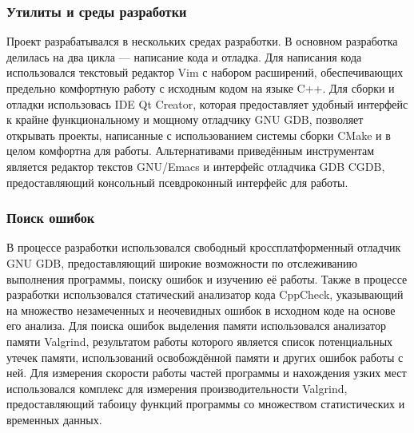 \documentclass[a4paper,12pt]{report}
\numberwithin{equation}{section}
\begin{document}
\subsubsection{Утилиты и среды разработки}
Проект разрабатывался в нескольких средах разработки. В основном разработка делилась на два цикла --- написание кода и отладка. Для написания кода использовался текстовый редактор Vim с набором расширений, обеспечивающих предельно комфортную работу с исходным кодом на языке C++. Для сборки и отладки использовась IDE Qt Creator, которая предоставляет удобный интерфейс к крайне функциональному и мощному отладчику GNU GDB, позволяет открывать проекты, написанные с использованием системы сборки CMake и в целом комфортна для работы. Альтернативами приведённым инструментам является редактор текстов GNU/Emacs и интерфейс отладчика GDB CGDB, предоставляющий консольный псевдроконный интерфейс для работы.

\subsubsection{Поиск ошибок}
В процессе разработки использовался свободный кроссплатформенный отладчик GNU GDB, предоставляющий широкие возможности по отслеживанию выполнения программы, поиску ошибок и изучению её работы. Также в процессе разработки использовался статический анализатор кода CppCheck, указывающий на множество незамеченных и неочевидных ошибок в исходном коде на основе его анализа. Для поиска ошибок выделения памяти использовался анализатор памяти Valgrind, результатом работы которого является список потенциальных утечек памяти, использований освобождённой памяти и других ошибок работы с ней. Для измерения скорости работы частей программы и нахождения узких мест использовался комплекс для измерения производительности Valgrind, предоставляющий табоицу функций программы со множеством статистических и временных данных.
\end{document}
